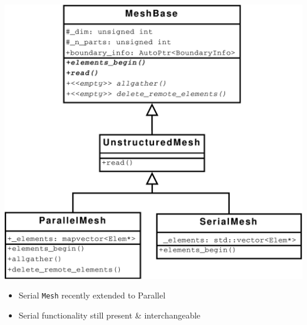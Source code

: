 \begin{frame}
\begin{minipage}[h]{.65\textwidth}
\begin{center}
\includegraphics[width=.95\textwidth]{figures/Mesh}
\end{center}
\end{minipage}
\begin{minipage}[h]{.3\textwidth}
\begin{itemize}
\item Serial \texttt{Mesh} recently extended to Parallel
\item Serial functionality still present \& interchangeable
\end{itemize}
\end{minipage}

\end{frame}
